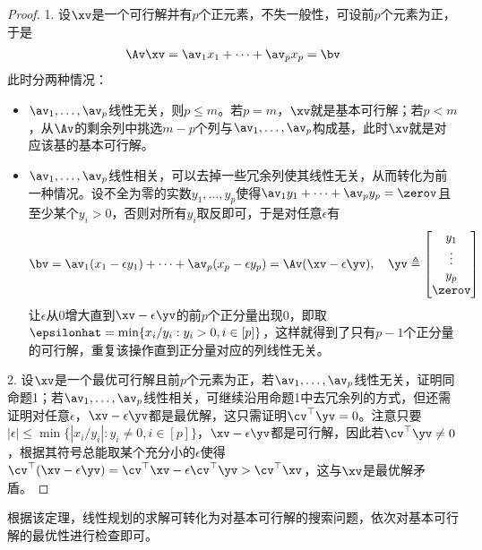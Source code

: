 \documentclass{ctexart}
\begin{document}
\begin{proof}
    1. 设$\xv$是一个可行解并有$p$个正元素，不失一般性，可设前$p$个元素为正，于是
    \begin{align*}
        \Av \xv = \av_1 x_1 + \cdots + \av_p x_p = \bv
    \end{align*}
    此时分两种情况：
    \begin{itemize}
        \item $\av_1, \ldots, \av_p$线性无关，则$p \le m$。若$p = m$，$\xv$就是基本可行解；若$p < m$，从$\Av$的剩余列中挑选$m-p$个列与$\av_1, \ldots, \av_p$构成基，此时$\xv$就是对应该基的基本可行解。
        \item $\av_1, \ldots, \av_p$线性相关，可以去掉一些冗余列使其线性无关，从而转化为前一种情况。设不全为零的实数$y_1, \ldots, y_p$使得$\av_1 y_1 + \cdots + \av_p y_p = \zerov$且至少某个$y_i > 0$，否则对所有$y_i$取反即可，于是对任意$\epsilon$有
              \begin{align*}
                  \bv = \av_1 (x_1 - \epsilon y_1) + \cdots + \av_p (x_p - \epsilon y_p) = \Av (\xv - \epsilon \yv), \quad
                  \yv \triangleq \begin{bmatrix}
                                     y_1 \\ \vdots \\ y_p \\ \zerov
                                 \end{bmatrix}
              \end{align*}
              让$\epsilon$从$0$增大直到$\xv - \epsilon \yv$的前$p$个正分量出现$0$，即取$\epsilonhat = \min\{ x_i / y_i: y_i > 0, i \in [p] \}$，这样就得到了只有$p-1$个正分量的可行解，重复该操作直到正分量对应的列线性无关。
    \end{itemize}

    2. 设$\xv$是一个最优可行解且前$p$个元素为正，若$\av_1, \ldots, \av_p$线性无关，证明同命题1；若$\av_1, \ldots, \av_p$线性相关，可继续沿用命题1中去冗余列的方式，但还需证明对任意$\epsilon$，$\xv - \epsilon \yv$都是最优解，这只需证明$\cv^\top \yv = 0$。注意只要$|\epsilon| \le \min\{ | x_i / y_i |: y_i \ne 0, i \in [p] \}$，$\xv - \epsilon \yv$都是可行解，因此若$\cv^\top \yv \ne 0$，根据其符号总能取某个充分小的$\epsilon$使得$\cv^\top (\xv - \epsilon \yv) = \cv^\top \xv - \epsilon \cv^\top \yv > \cv^\top \xv$，这与$\xv$是最优解矛盾。
\end{proof}

根据该定理，线性规划的求解可转化为对基本可行解的搜索问题，依次对基本可行解的最优性进行检查即可。
\end{document}

